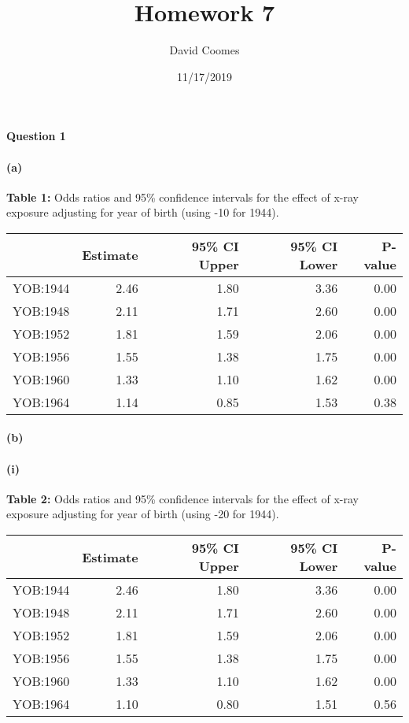 \documentclass[]{article}
\title{Homework 7}
\author{David Coomes}
\date{11/17/2019}
\let\oldparagraph\paragraph
\renewcommand{\paragraph}[1]{\oldparagraph{#1}\mbox{}}
\begin{document}
\maketitle

\paragraph{Question 1}\label{question-1}

\paragraph{(a)}\label{a}

\textbf{Table 1:} Odds ratios and 95\% confidence intervals for the
effect of x-ray exposure adjusting for year of birth (using -10 for
1944).

\begin{table}[H]
\centering
\begin{tabular}{l|r|r|r|r}
\hline
  & Estimate & 95\% CI Upper & 95\% CI Lower & P-value\\
\hline
YOB:1944 & 2.46 & 1.80 & 3.36 & 0.00\\
\hline
YOB:1948 & 2.11 & 1.71 & 2.60 & 0.00\\
\hline
YOB:1952 & 1.81 & 1.59 & 2.06 & 0.00\\
\hline
YOB:1956 & 1.55 & 1.38 & 1.75 & 0.00\\
\hline
YOB:1960 & 1.33 & 1.10 & 1.62 & 0.00\\
\hline
YOB:1964 & 1.14 & 0.85 & 1.53 & 0.38\\
\hline
\end{tabular}
\end{table}

\paragraph{(b)}\label{b}

\paragraph{(i)}\label{i}

\textbf{Table 2:} Odds ratios and 95\% confidence intervals for the
effect of x-ray exposure adjusting for year of birth (using -20 for
1944).

\begin{table}[H]
\centering
\begin{tabular}{l|r|r|r|r}
\hline
  & Estimate & 95\% CI Upper & 95\% CI Lower & P-value\\
\hline
YOB:1944 & 2.46 & 1.80 & 3.36 & 0.00\\
\hline
YOB:1948 & 2.11 & 1.71 & 2.60 & 0.00\\
\hline
YOB:1952 & 1.81 & 1.59 & 2.06 & 0.00\\
\hline
YOB:1956 & 1.55 & 1.38 & 1.75 & 0.00\\
\hline
YOB:1960 & 1.33 & 1.10 & 1.62 & 0.00\\
\hline
YOB:1964 & 1.10 & 0.80 & 1.51 & 0.56\\
\hline
\end{tabular}
\end{table}
\end{document}
